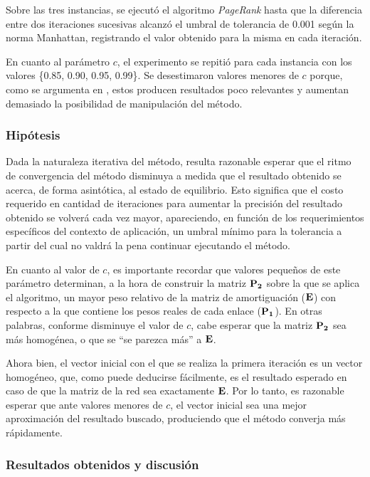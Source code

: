             Sobre las tres instancias, se ejecutó el algoritmo \emph{PageRank} hasta que la diferencia entre dos iteraciones sucesivas alcanzó el umbral de tolerancia de 0.001 según la norma Manhattan, registrando el valor obtenido para la misma en cada iteración.

            En cuanto al parámetro $c$, el experimento se repitió para cada instancia con los valores \{0.85, 0.90, 0.95, 0.99\}. Se desestimaron valores menores de $c$ porque, como se argumenta en \cite{Kamvar2003}, estos producen resultados poco relevantes y aumentan demasiado la posibilidad de manipulación del método.

            \subsubsection*{Hipótesis}
            Dada la naturaleza iterativa del método, resulta razonable esperar que el ritmo de convergencia del método disminuya a medida que el resultado obtenido se acerca, de forma asintótica, al estado de equilibrio. Esto significa que el costo requerido en cantidad de iteraciones para aumentar la precisión del resultado obtenido se volverá cada vez mayor, apareciendo, en función de los requerimientos específicos del contexto de aplicación, un umbral mínimo para la tolerancia a partir del cual no valdrá la pena continuar ejecutando el método.

            En cuanto al valor de $c$, es importante recordar que valores pequeños de este parámetro determinan, a la hora de construir la matriz $\mathbf{P_2}$ sobre la que se aplica el algoritmo, un mayor peso relativo de la matriz de amortiguación ($\mathbf{E}$) con respecto a la que contiene los pesos reales de cada enlace ($\mathbf{P_1}$). En otras palabras, conforme disminuye el valor de $c$, cabe esperar que la matriz $\mathbf{P_2}$ sea más homogénea, o que se “se parezca más” a $\mathbf{E}$.

            Ahora bien, el vector inicial con el que se realiza la primera iteración es un vector homogéneo, que, como puede deducirse fácilmente, es el resultado esperado en caso de que la matriz de la red sea exactamente $\mathbf{E}$. Por lo tanto, es razonable esperar que ante valores menores de $c$, el vector inicial sea una mejor aproximación del resultado buscado, produciendo que el método converja más rápidamente.

            \subsubsection*{Resultados obtenidos y discusión}

